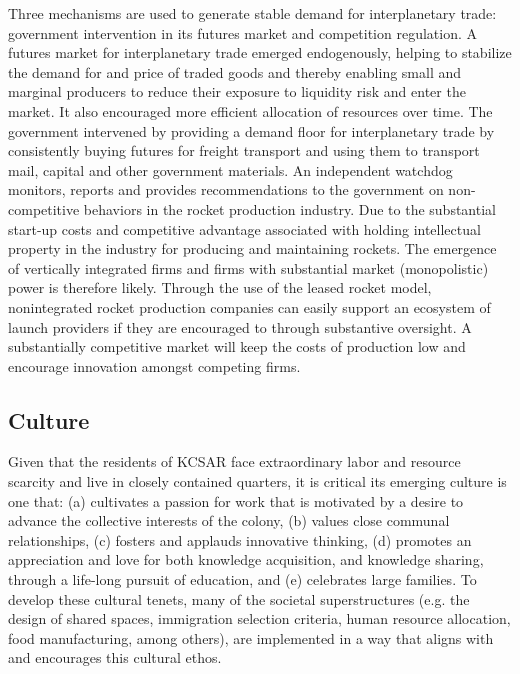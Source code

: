 \documentclass[fleqn,10pt]{Stylesheet} %
\begin{document}
Three mechanisms are used to generate stable demand for interplanetary trade: government intervention in its futures market and competition regulation. A futures market for interplanetary trade emerged endogenously, helping to stabilize the demand for and price of traded goods and thereby enabling small and marginal producers to reduce their exposure to liquidity risk and enter the market. It also encouraged more efficient allocation of resources over time. The government intervened by providing a demand floor for interplanetary trade by consistently buying futures for freight transport and using them to transport mail, capital and other government materials. An independent watchdog monitors, reports and provides recommendations to the government on non-competitive behaviors in the rocket production industry. Due to the substantial start-up costs and competitive advantage associated with holding intellectual property in the industry for producing and maintaining rockets. The emergence of vertically integrated firms and firms with substantial market (monopolistic) power is therefore likely. Through the use of the leased rocket model, nonintegrated rocket production companies can easily support an ecosystem of launch providers if they are encouraged to through substantive oversight. A substantially competitive market will keep the costs of production low and encourage innovation amongst competing firms.

\subsection{Culture}
Given that the residents of KCSAR face extraordinary labor and resource scarcity and live in closely contained quarters, it is critical its emerging culture is one that: (a) cultivates a passion for work that is motivated by a desire to advance the collective interests of the colony, (b) values close communal relationships, (c) fosters and applauds innovative thinking, (d) promotes an appreciation and love for both knowledge acquisition, and knowledge sharing, through a life-long pursuit of education, and (e) celebrates large families. To develop these cultural tenets, many of the societal superstructures (e.g. the design of shared spaces, immigration selection criteria, human resource allocation, food manufacturing, among others), are implemented in a way that aligns with and encourages this cultural ethos.
\end{document}
